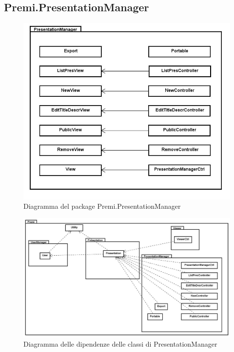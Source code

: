 \subsection{Premi.PresentationManager}
\begin{figure}[h!]
\begin{center}
\includegraphics[scale=0.35]{img/diapkg/vecchi/presentationmanager-class.jpg}
\caption{Diagramma del package Premi.PresentationManager}
\end{center}
\end{figure}
\begin{figure}[h!]
\begin{center}
\includegraphics[scale=0.35]{img/diapkg/vecchi/Completo_dettagliato.jpg}
\caption{Diagramma delle dipendenze delle classi di PresentationManager}
\end{center}
\end{figure}

